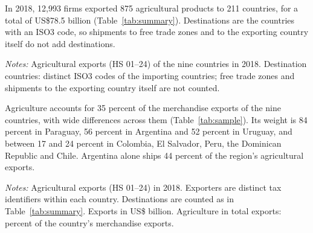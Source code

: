 In 2018, 12,993 firms exported 875 agricultural products to 211 countries, for a total of US\$78.5 billion
(Table~\ref{tab:summary}). Destinations are the countries with an ISO3 code, so shipments to free trade zones and
to the exporting country itself do not add destinations.
\begin{table}[htbp]
\centering
\caption{Agricultural sample summary, 2018}
\label{tab:summary}
{\small\setlength{\tabcolsep}{4pt}\setlength{\extrarowheight}{1pt}
}

\begin{minipage}{0.95\linewidth}
\notesize
\vspace{0.6em}
\textit{Notes:} Agricultural exports (HS 01--24) of the nine countries in 2018. Destination countries: distinct ISO3 codes of the importing countries; free trade zones and shipments to the exporting country itself are not counted.\\
\srcnote
\end{minipage}
\end{table}

Agriculture accounts for 35 percent of the merchandise exports of the nine countries, with wide differences
across them (Table~\ref{tab:sample}). Its weight is 84 percent in Paraguay, 56 percent in Argentina and 52 percent
in Uruguay, and between 17 and 24 percent in Colombia, El Salvador, Peru, the Dominican Republic and Chile.
Argentina alone ships 44 percent of the region's agricultural exports.
\begin{table}[htbp]
\centering
\caption{Agricultural exports, by exporting country, 2018}
\label{tab:sample}
{\small\setlength{\tabcolsep}{4pt}\setlength{\extrarowheight}{1pt}
}

\begin{minipage}{0.95\linewidth}
\notesize
\vspace{0.6em}
\textit{Notes:} Agricultural exports (HS 01--24) in 2018. Exporters are distinct tax identifiers within each country. Destinations are counted as in Table~\ref{tab:summary}. Exports in US\$ billion. Agriculture in total exports: percent of the country's merchandise exports.\\
\srcnote
\end{minipage}
\end{table}

